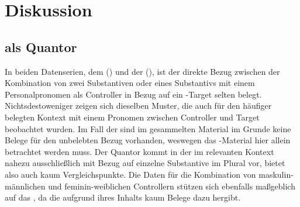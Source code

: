 \chapter{Diskussion}
\label{ch:diskussion}


\section{ als Quantor}


In beiden Datenserien, dem  () und der
 (\citet{kc}), ist der direkte Bezug zwischen der Kombination von
zwei Substantiven oder eines Substantivs mit einem Personalpronomen als
Controller in Bezug auf ein -Target selten belegt.
Nichtsdestoweniger zeigen sich dieselben Muster, die auch für den häufiger
belegten Kontext mit einem Pronomen zwischen Controller und Target beobachtet
wurden. Im Fall der \citet{kc} sind im gesammelten Material im Grunde keine
Belege für den unbelebten Bezug vorhanden, weswegen das
-Material hier allein betrachtet werden muss. Der Quantor
  \autocite[vgl.][606--621]{ksw2} kommt in der \citet{kc}
im relevanten Kontext nahezu ausschließlich mit Bezug auf einzelne
Substan\-tive im Plural vor, bietet also auch kaum Vergleichspunkte. Die Daten
für die Kombination von maskulin-männlichen und feminin-weiblichen Controllern
stützen sich ebenfalls maßgeblich auf das , da die \citet{kc}
aufgrund ihres Inhalts kaum Belege dazu hergibt.


